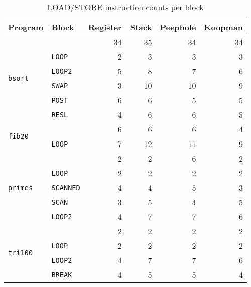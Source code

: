 \begin{table}
\begin{tabular}{l l r r r r}
  Program & Block & Register & Stack & Peephole & Koopman \\ \toprule
  \multirow{6}{*}{\texttt{bsort}}  & & 34 & 35 & 34 & 34 \\
  & \texttt{LOOP}                    &  2 &  3 &  3 &  3 \\
  & \texttt{LOOP2}                   &  5 &  8 &  7 &  6 \\
  & \texttt{SWAP}                    &  3 & 10 & 10 &  9 \\
  & \texttt{POST}                    &  6 &  6 &  5 &  5 \\
  & \texttt{RESL}                    &  4 &  6 &  6 &  5 \\ \midrule
  \multirow{2}{*}{\texttt{fib20}}  & &  6 &  6 &  6 &  4 \\
  & \texttt{LOOP}                    &  7 & 12 & 11 &  9 \\ \midrule
  \multirow{5}{*}{\texttt{primes}} & &  2 &  2 &  6 &  2 \\
  & \texttt{LOOP}                    &  2 &  2 &  2 &  2 \\
  & \texttt{SCANNED}                 &  4 &  4 &  5 &  3 \\
  & \texttt{SCAN}                    &  3 &  5 &  4 &  5 \\
  & \texttt{LOOP2}                   &  4 &  7 &  7 &  6 \\ \midrule
  \multirow{5}{*}{\texttt{tri100}} & &  2 &  2 &  2 &  2 \\
  & \texttt{LOOP}                    &  2 &  2 &  2 &  2 \\
  & \texttt{LOOP2}                   &  4 &  7 &  7 &  6 \\
  & \texttt{BREAK}                   &  4 &  5 &  5 &  4 \\
\end{tabular}
  \caption{LOAD/STORE instruction counts per block}
\label{tab:meminstructionperblock}
\end{table}


\blockmemdata%

